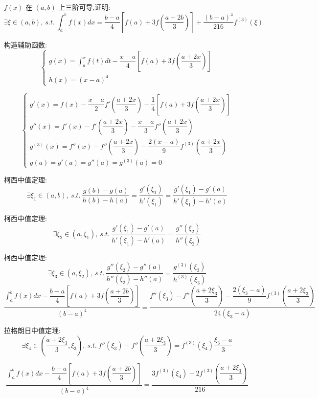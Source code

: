 \begin{proposition}
	$f(x)$ 在 $(a,b)$ 上三阶可导,证明: 
	$$\exists\xi\in(a,b),\ s.t.\ \int_{a}^{b}f(x)dx=\frac{b-a}{4}\left[f(a)+3f(\frac{a+2b}{3}) \right]+\frac{(b-a)^4}{216}f^{(3)}(\xi) $$
\end{proposition}
\begin{solution}

	构造辅助函数:
	$$\begin{cases}
		g(x) = \displaystyle{\int_{a}^{x}f(t)dt}-\dfrac{x-a}{4}\left[f(a)+3f(\dfrac{a+2x}{3})\right]\\
		h(x) = (x-a)^{4} 
	\end{cases}$$

	$$\begin{cases}
		g'(x) = f(x) - \dfrac{x-a}{2}f'(\dfrac{a+2x}{3})-\dfrac{1}{4}\left[f(a)+3f(\dfrac{a+2x}{3})\right]\\
		g''(x) = f'(x) - f'(\dfrac{a+2x}{3}) - \dfrac{x-a}{3}f''(\dfrac{a+2x}{3})\\
		g^{(3)}(x) = f''(x) - f''(\dfrac{a+2x}{3}) - \dfrac{2(x-a)}{9}f^{(3)}(\dfrac{a+2x}{3})\\
		g(a) = g'(a) = g''(a) = g^{(3)}(a) = 0
	\end{cases}$$

	柯西中值定理:
	$$\exists \xi_{1}\in (a,b),\ s.t.\ \dfrac{g(b)-g(a)}{h(b)-h(a)} = \dfrac{g'(\xi_{1})}{h'(\xi_{1})} = \dfrac{g'(\xi_{1})-g'(a)}{h'(\xi_{1})-h'(a)}$$

	柯西中值定理:
	$$\exists \xi_{2}\in (a,\xi_{1}),\ s.t.\ \dfrac{g'(\xi_{1})-g'(a)}{h'(\xi_{1})-h'(a)} = \dfrac{g''(\xi_{2})}{h''(\xi_{2})} $$

	柯西中值定理:
	$$\exists \xi_{3}\in (a,\xi_{2}),\ s.t.\ \dfrac{g''(\xi_{2})-g''(a)}{h''(\xi_{2})-h''(a)} = \dfrac{g^{(3)}(\xi_{3})}{h^{(3)}(\xi_{3})} $$
	$$\dfrac{\displaystyle{\int_{a}^{b}f(x)dx}-\dfrac{b-a}{4}\left[f(a)+3f(\dfrac{a+2b}{3})\right]}{(b-a)^{4}} =
	 \dfrac{f''(\xi_{3}) - f''(\dfrac{a+2\xi_{3}}{3}) - \dfrac{2(\xi_{3}-a)}{9}f^{(3)}(\dfrac{a+2\xi_{3}}{3})}{24(\xi_{3}-a)}$$

	拉格朗日中值定理:
	$$\exists \xi_{4}\in(\dfrac{a+2\xi_{3}}{3},\xi_{3}),\ s.t.\ f''(\xi_{3}) - f''(\dfrac{a+2\xi_{3}}{3}) = f^{(3)}(\xi_{4})\dfrac{\xi_{3}-a}{3}$$

	$$\dfrac{\displaystyle{\int_{a}^{b}f(x)dx}-\dfrac{b-a}{4}\left[f(a)+3f(\dfrac{a+2b}{3})\right]}{(b-a)^{4}} =
	 \dfrac{3f^{(3)}(\xi_{4})-2f^{(3)}(\dfrac{a+2\xi_{3}}{3})}{216}$$
\end{solution}

